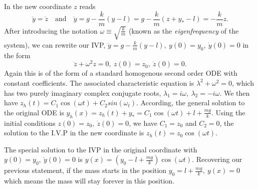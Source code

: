\documentclass[11pt,a4paper,twoside]{article}
\begin{document}
	In the new coordinate $z$ reads
	$$
	\ddot{y} = \ddot{z}\quad \text{and}\quad \ddot{y} = g-\frac{k}{m}(y-l) = g-\frac{k}{m}(z+y_*-l) = -\frac{k}{m}z.
	$$
	After introducing the notation $\omega \equiv \sqrt{\frac{k}{m}}$ (known as the \textit{eigenfrequency} of the system), we can rewrite our IVP, $\ddot{y} = g-\frac{k}{m}(y-l),\ y(0) = y_0,\ \dot{y}(0) = 0$ in the form
	$$
	\ddot{z} + \omega^2z = 0,\ z(0) = z_0,\ \dot{z}(0) = 0.
	$$
	Again this is of the form of a standard homogenous second order ODE with constant coefficients. The associated characteristic equation is $\lambda^2 + \omega^2 = 0$, which has two purely imaginary complex conjugate roots, $\lambda_1 = i\omega,\ \lambda_2 = −i\omega$. We then have $z_h(t) = C_1 \cos(\omega t) + C_2 sin(\omega_t)$. According, the general solution to the original ODE is $y_h(x) = z_h(t) + y_* = C_1\cos (\omega t) + l + \frac{mg}{k}$. Using the initial conditions $z(0) = z_0,\ \dot{z}(0) = 0$, we have $C_1 = z_0$ and $C_2 = 0$, the solution to the I.V.P in the new coordinate is $z_h(t) = z_0\cos(\omega t)$.\par
	The special solution to the IVP in the original coordinate with $y(0) = y_0,\ \dot{y}(0) = 0$ is $y(x) = (y_0-l+\frac{mg}{k})\cos(\omega t)$. Recovering our previous statement, if the mass starts in the position $y_0 = l + \frac{mg}{k},\ y(x) = 0$ which means the mass will stay forever in this position.
\end{document}
